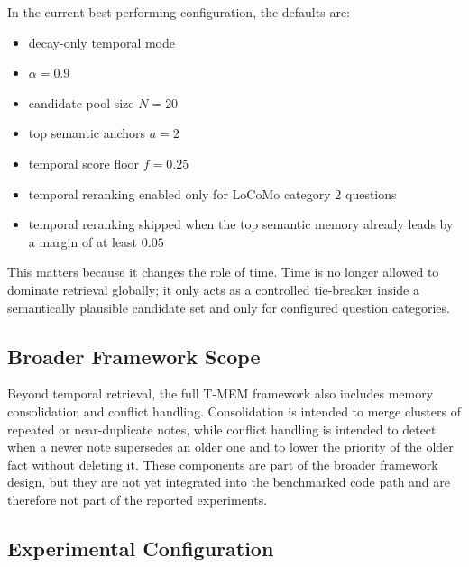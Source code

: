 \documentclass[conference]{IEEEtran}
\begin{document}
In the current best-performing configuration, the defaults are:
\begin{itemize}
    \item decay-only temporal mode
    \item $\alpha = 0.9$
    \item candidate pool size $N = 20$
    \item top semantic anchors $a = 2$
    \item temporal score floor $f = 0.25$
    \item temporal reranking enabled only for LoCoMo category 2 questions
    \item temporal reranking skipped when the top semantic memory already leads by a margin of at least $0.05$
\end{itemize}

This matters because it changes the role of time. Time is no longer allowed to dominate retrieval globally; it only acts as a controlled tie-breaker inside a semantically plausible candidate set and only for configured question categories.

\subsection{Broader Framework Scope}

Beyond temporal retrieval, the full T-MEM framework also includes memory consolidation and conflict handling. Consolidation is intended to merge clusters of repeated or near-duplicate notes, while conflict handling is intended to detect when a newer note supersedes an older one and to lower the priority of the older fact without deleting it. These components are part of the broader framework design, but they are not yet integrated into the benchmarked code path and are therefore not part of the reported experiments.

\subsection{Experimental Configuration}
\end{document}
